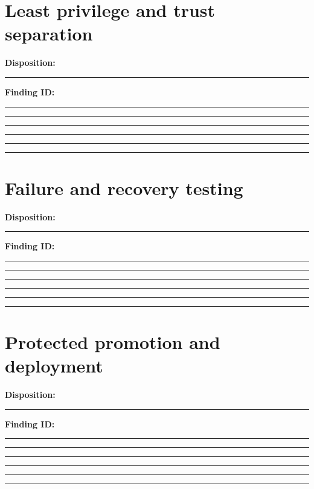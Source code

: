 \documentclass[11pt,letterpaper]{article}
\begin{document}
\section{Least privilege and trust separation}
\noindent\textbf{Disposition:}\rule{2.5cm}{0.4pt}\quad\textbf{Finding ID:}\rule{4cm}{0.4pt}

\vspace{2mm}
\noindent\rule{0.93\linewidth}{0.4pt}\par\vspace{13pt}
\noindent\rule{0.93\linewidth}{0.4pt}\par\vspace{13pt}
\noindent\rule{0.93\linewidth}{0.4pt}\par\vspace{13pt}
\noindent\rule{0.93\linewidth}{0.4pt}\par\vspace{13pt}
\noindent\rule{0.93\linewidth}{0.4pt}\par\vspace{13pt}
\section{Failure and recovery testing}
\noindent\textbf{Disposition:}\rule{2.5cm}{0.4pt}\quad\textbf{Finding ID:}\rule{4cm}{0.4pt}

\vspace{2mm}
\noindent\rule{0.93\linewidth}{0.4pt}\par\vspace{13pt}
\noindent\rule{0.93\linewidth}{0.4pt}\par\vspace{13pt}
\noindent\rule{0.93\linewidth}{0.4pt}\par\vspace{13pt}
\noindent\rule{0.93\linewidth}{0.4pt}\par\vspace{13pt}
\noindent\rule{0.93\linewidth}{0.4pt}\par\vspace{13pt}
\section{Protected promotion and deployment}
\noindent\textbf{Disposition:}\rule{2.5cm}{0.4pt}\quad\textbf{Finding ID:}\rule{4cm}{0.4pt}

\vspace{2mm}
\noindent\rule{0.93\linewidth}{0.4pt}\par\vspace{13pt}
\noindent\rule{0.93\linewidth}{0.4pt}\par\vspace{13pt}
\noindent\rule{0.93\linewidth}{0.4pt}\par\vspace{13pt}
\noindent\rule{0.93\linewidth}{0.4pt}\par\vspace{13pt}
\noindent\rule{0.93\linewidth}{0.4pt}\par\vspace{13pt}
\end{document}
